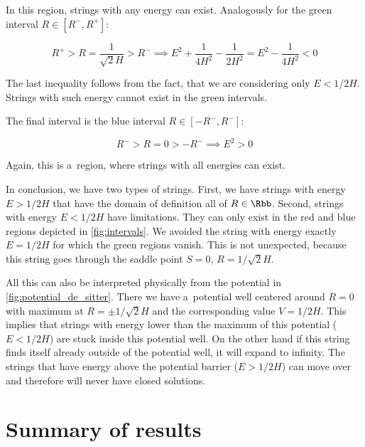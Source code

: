 \noindent
In this region, strings with any energy can exist. Analogously for the green interval $R \in [R^{-},R^{+}]$:

\begin{equation}
    R^{+} > R = \frac{1}{\sqrt{2}H} > R^{-} \implies E^2 + \frac{1}{4 H^2} - \frac{1}{2 H^2} = E^2 -\frac{1}{4 H^2} < 0
\end{equation}

\noindent
The last inequality follows from the fact, that we are considering only $E < 1/2H$. Strings with such energy cannot exist in the green intervals.

The final interval is the blue interval $R \in [-R^{-}, R^{-}]$:

\begin{equation}
    R^{-} > R = 0 > -R^{-} \implies E^2 > 0
\end{equation}

\noindent
Again, this is a~region, where strings with all energies can exist.

In conclusion, we have two types of strings. First, we have strings with energy $E > 1/2H$ that have the domain of definition all of $R \in \Rbb$. Second, strings with energy $E < 1/2H$ have limitations. They can only exist in the red and blue regions depicted in \cref{fig:intervals}. We avoided the string with energy exactly $E = 1/2H$ for which the green regions vanish. This is not unexpected, because this string goes through the saddle point $S = 0$, $R =1/\sqrt{2}H$.

All this can also be interpreted physically from the potential in \cref{fig:potential_de_sitter}.
There we have a~potential well centered around $R = 0$ with maximum at $R = \pm 1/\sqrt{2}H$ and the corresponding value $V = 1/2H$. This implies that strings with energy lower than the maximum of this potential ($E < 1/2H$) are stuck inside this potential well. On the other hand if this string finds itself already outside of the potential well, it will expand to infinity. The strings that have energy above the potential barrier ($E > 1/2H$) can move over and therefore will never have closed solutions.



\section{Summary of results}

